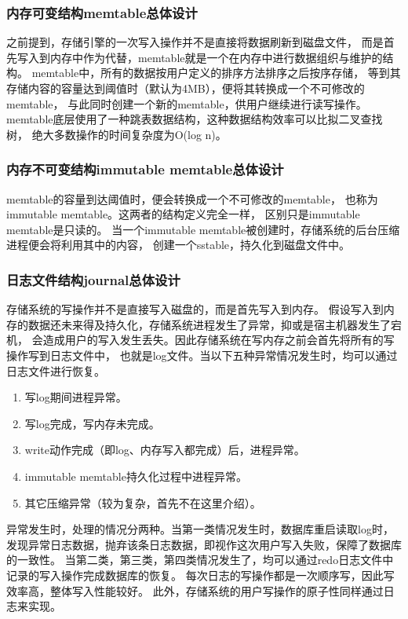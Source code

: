 		\subsubsection{内存可变结构memtable总体设计}
		
		之前提到，存储引擎的一次写入操作并不是直接将数据刷新到磁盘文件，
		而是首先写入到内存中作为代替，memtable就是一个在内存中进行数据组织与维护的结构。
		memtable中，所有的数据按用户定义的排序方法排序之后按序存储，
		等到其存储内容的容量达到阈值时（默认为4MB），便将其转换成一个不可修改的memtable，
		与此同时创建一个新的memtable，供用户继续进行读写操作。
		memtable底层使用了一种跳表数据结构，这种数据结构效率可以比拟二叉查找树，
		绝大多数操作的时间复杂度为O(log n)。

		\subsubsection{内存不可变结构immutable memtable总体设计}

		memtable的容量到达阈值时，便会转换成一个不可修改的memtable，
		也称为immutable memtable。这两者的结构定义完全一样，
		区别只是immutable memtable是只读的。
		当一个immutable memtable被创建时，存储系统的后台压缩进程便会将利用其中的内容，
		创建一个sstable，持久化到磁盘文件中。

		\subsubsection{日志文件结构journal总体设计}

		存储系统的写操作并不是直接写入磁盘的，而是首先写入到内存。
		假设写入到内存的数据还未来得及持久化，存储系统进程发生了异常，抑或是宿主机器发生了宕机，
		会造成用户的写入发生丢失。因此存储系统在写内存之前会首先将所有的写操作写到日志文件中，
		也就是log文件。当以下五种异常情况发生时，均可以通过日志文件进行恢复。

		\begin{enumerate}
			\item 写log期间进程异常。
			\item 写log完成，写内存未完成。
			\item write动作完成（即log、内存写入都完成）后，进程异常。
			\item immutable memtable持久化过程中进程异常。
			\item 其它压缩异常（较为复杂，首先不在这里介绍）。
		\end{enumerate}
	
		异常发生时，处理的情况分两种。当第一类情况发生时，数据库重启读取log时，
		发现异常日志数据，抛弃该条日志数据，即视作这次用户写入失败，保障了数据库的一致性。
		当第二类，第三类，第四类情况发生了，均可以通过redo日志文件中记录的写入操作完成数据库的恢复。
		每次日志的写操作都是一次顺序写，因此写效率高，整体写入性能较好。
		此外，存储系统的用户写操作的原子性同样通过日志来实现。

